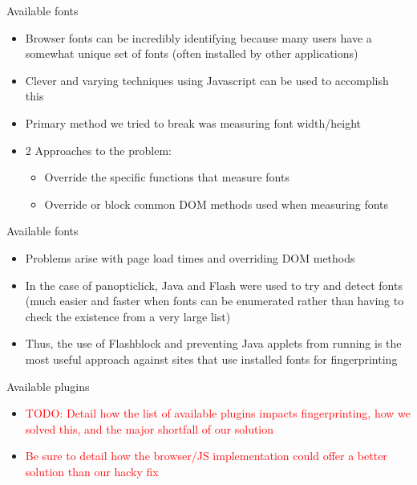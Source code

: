 \begin{frame}[fragile,t]{Available fonts}
	\begin{itemize}
		\item Browser fonts can be incredibly identifying because many users have a somewhat unique set of fonts (often installed by other applications)
		\item Clever and varying techniques using Javascript can be used to accomplish this
		\item Primary method we tried to break was measuring font width/height
		\item 2 Approaches to the problem:
			\begin{itemize}
				\item Override the specific functions that measure fonts
				\item Override or block common DOM methods used when measuring fonts
			\end{itemize}
	\end{itemize}
\end{frame}

\begin{frame}[fragile,t]{Available fonts}
	\begin{itemize}
		\item Problems arise with page load times and overriding DOM methods
		\item In the case of panopticlick, Java and Flash were used to try and detect fonts (much easier and faster when fonts can be enumerated rather than having to check the existence from a very large list)
		\item Thus, the use of Flashblock and preventing Java applets from running is the most useful approach against sites that use installed fonts for fingerprinting
	\end{itemize}
\end{frame}

\begin{frame}[fragile,t]{Available plugins}
	\begin{itemize}
		\item \textcolor{red}{TODO: Detail how the list of available plugins impacts fingerprinting, how we solved this, and the major shortfall of our solution}
		\item \textcolor{red}{Be sure to detail how the browser/JS implementation could offer a better solution than our hacky fix}
	\end{itemize}
\end{frame}

